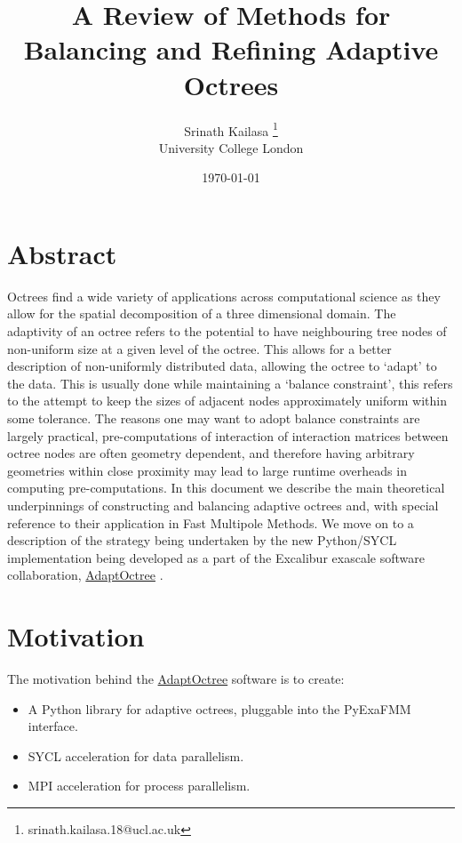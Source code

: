 \documentclass[12pt, a4, twoside]{article}
\title{A Review of Methods for Balancing and Refining Adaptive Octrees}
\author{Srinath Kailasa \thanks{srinath.kailasa.18@ucl.ac.uk} \\ \small University College London}
\date{\today}
\begin{document}
\maketitle

\section*{Abstract}

Octrees find a wide variety of applications across computational science as they allow for the spatial decomposition of a three dimensional domain. The adaptivity of an octree refers to the potential to have neighbouring tree nodes of non-uniform size at a given level of the octree. This allows for a better description of non-uniformly distributed data, allowing the octree to `adapt' to the data. This is usually done while maintaining a `balance constraint', this refers to the attempt to keep the sizes of adjacent nodes approximately uniform within some tolerance. The reasons one may want to adopt balance constraints are largely practical, pre-computations of interaction of interaction matrices between octree nodes are often geometry dependent, and therefore having arbitrary geometries within close proximity may lead to large runtime overheads in computing pre-computations. In this document we describe the main theoretical underpinnings of constructing and balancing adaptive octrees and, with special reference to their application in Fast Multipole Methods. We move on to a description of the strategy being undertaken by the new Python/SYCL implementation being developed as a part of the Excalibur exascale software collaboration, \href{https://github.com/Excalibur-SLE/AdaptOctree}{AdaptOctree}  \cite{excalibur}.

\section*{Motivation}

The motivation behind the \href{https://github.com/Excalibur-SLE/AdaptOctree}{AdaptOctree} software is to create:

\begin{itemize}
    \item A Python library for adaptive octrees, pluggable into the PyExaFMM interface.
    \item SYCL acceleration for data parallelism.
    \item MPI acceleration for process parallelism.
\end{itemize}
\end{document}
